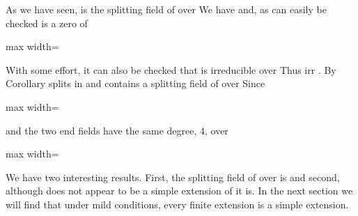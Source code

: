 \documentclass[11pt,oneside]{article}
\begin{document}
\begin{BookBody}
 As we have seen,  is the splitting field of  over  We have  and, as can easily be checked\BookInline{,\allowbreak \alpha } is a zero of

\begin{center}\begin{adjustbox}{max width=\linewidth}\end{adjustbox}\end{center}

\noindent With some effort, it can also be checked that  is irreducible over  Thus irr . By Corollary  splits in  and  contains a splitting field  of  over  Since

\begin{center}\begin{adjustbox}{max width=\linewidth}\end{adjustbox}\end{center}

\noindent and the two end fields have the same degree, 4, over 

\begin{center}\begin{adjustbox}{max width=\linewidth}\end{adjustbox}\end{center}

\noindent We have two interesting results. First, the splitting field of  over  is  and second, although  does not appear to be a simple extension of  it is. In the next section we will find that under mild conditions, every finite extension is a simple extension.


\end{BookBody}
\end{document}
